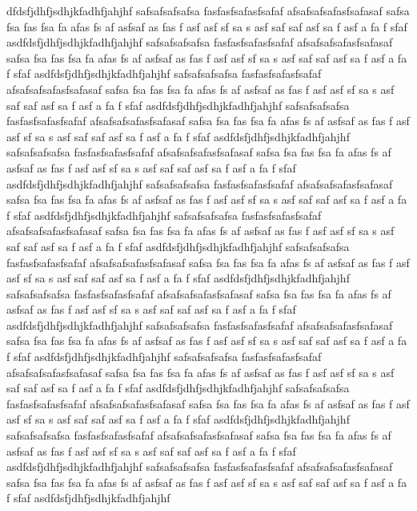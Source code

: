 dfdsfjdhfjsdhjkfadhfjahjhf
safsafsafsafsa
fasfasfsafasfsafaf
afsafsafsafasfsafasaf safsa fsa fas fsa fa afas fs af asfsaf as fas f asf asf sf sa s asf saf saf asf sa f asf a fa f sfaf asdfdsfjdhfjsdhjkfadhfjahjhf
safsafsafsafsa
fasfasfsafasfsafaf
afsafsafsafasfsafasaf safsa fsa fas fsa fa afas fs af asfsaf as fas f asf asf sf sa s asf saf saf asf sa f asf a fa f sfaf asdfdsfjdhfjsdhjkfadhfjahjhf
safsafsafsafsa
fasfasfsafasfsafaf
afsafsafsafasfsafasaf safsa fsa fas fsa fa afas fs af asfsaf as fas f asf asf sf sa s asf saf saf asf sa f asf a fa f sfaf asdfdsfjdhfjsdhjkfadhfjahjhf
safsafsafsafsa
fasfasfsafasfsafaf
afsafsafsafasfsafasaf safsa fsa fas fsa fa afas fs af asfsaf as fas f asf asf sf sa s asf saf saf asf sa f asf a fa f sfaf asdfdsfjdhfjsdhjkfadhfjahjhf
safsafsafsafsa
fasfasfsafasfsafaf
afsafsafsafasfsafasaf safsa fsa fas fsa fa afas fs af asfsaf as fas f asf asf sf sa s asf saf saf asf sa f asf a fa f sfaf asdfdsfjdhfjsdhjkfadhfjahjhf
safsafsafsafsa
fasfasfsafasfsafaf
afsafsafsafasfsafasaf safsa fsa fas fsa fa afas fs af asfsaf as fas f asf asf sf sa s asf saf saf asf sa f asf a fa f sfaf asdfdsfjdhfjsdhjkfadhfjahjhf
safsafsafsafsa
fasfasfsafasfsafaf
afsafsafsafasfsafasaf safsa fsa fas fsa fa afas fs af asfsaf as fas f asf asf sf sa s asf saf saf asf sa f asf a fa f sfaf asdfdsfjdhfjsdhjkfadhfjahjhf
safsafsafsafsa
fasfasfsafasfsafaf
afsafsafsafasfsafasaf safsa fsa fas fsa fa afas fs af asfsaf as fas f asf asf sf sa s asf saf saf asf sa f asf a fa f sfaf asdfdsfjdhfjsdhjkfadhfjahjhf
safsafsafsafsa
fasfasfsafasfsafaf
afsafsafsafasfsafasaf safsa fsa fas fsa fa afas fs af asfsaf as fas f asf asf sf sa s asf saf saf asf sa f asf a fa f sfaf asdfdsfjdhfjsdhjkfadhfjahjhf
safsafsafsafsa
fasfasfsafasfsafaf
afsafsafsafasfsafasaf safsa fsa fas fsa fa afas fs af asfsaf as fas f asf asf sf sa s asf saf saf asf sa f asf a fa f sfaf asdfdsfjdhfjsdhjkfadhfjahjhf
safsafsafsafsa
fasfasfsafasfsafaf
afsafsafsafasfsafasaf safsa fsa fas fsa fa afas fs af asfsaf as fas f asf asf sf sa s asf saf saf asf sa f asf a fa f sfaf asdfdsfjdhfjsdhjkfadhfjahjhf
safsafsafsafsa
fasfasfsafasfsafaf
afsafsafsafasfsafasaf safsa fsa fas fsa fa afas fs af asfsaf as fas f asf asf sf sa s asf saf saf asf sa f asf a fa f sfaf asdfdsfjdhfjsdhjkfadhfjahjhf
safsafsafsafsa
fasfasfsafasfsafaf
afsafsafsafasfsafasaf safsa fsa fas fsa fa afas fs af asfsaf as fas f asf asf sf sa s asf saf saf asf sa f asf a fa f sfaf asdfdsfjdhfjsdhjkfadhfjahjhf
safsafsafsafsa
fasfasfsafasfsafaf
afsafsafsafasfsafasaf safsa fsa fas fsa fa afas fs af asfsaf as fas f asf asf sf sa s asf saf saf asf sa f asf a fa f sfaf asdfdsfjdhfjsdhjkfadhfjahjhf
